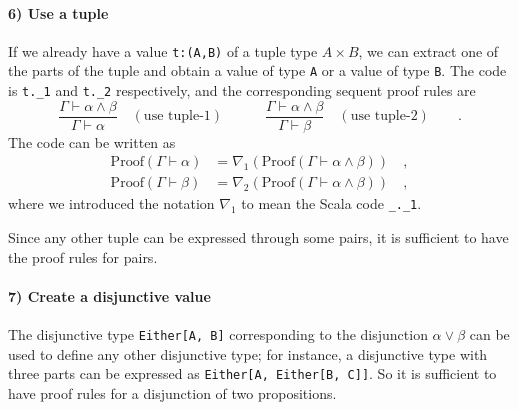 \paragraph{6) Use a tuple}

If we already have a value \lstinline!t:(A,B)!
of a tuple type $A\times B$, we can extract one of the parts of the
tuple and obtain a value of type \lstinline!A!
or a value of type \lstinline!B!.
The code is \lstinline!t._1!
and \lstinline!t._2! respectively,
and the corresponding sequent proof rules are
\[
\frac{\Gamma\vdash\alpha\wedge\beta}{\Gamma\vdash\alpha}\quad(\text{use tuple-}1)\quad\quad\quad\frac{\Gamma\vdash\alpha\wedge\beta}{\Gamma\vdash\beta}\quad(\text{use tuple-}2)\quad\quad.
\]
The code can be written as
\begin{align*}
\text{Proof}\left(\Gamma\vdash\alpha\right) & =\nabla_{1}\left(\text{Proof}\left(\Gamma\vdash\alpha\wedge\beta\right)\right)\quad,\\
\text{Proof}\left(\Gamma\vdash\beta\right) & =\nabla_{2}\left(\text{Proof}\left(\Gamma\vdash\alpha\wedge\beta\right)\right)\quad,
\end{align*}
where we introduced the notation $\nabla_{1}$ to mean the Scala code
\lstinline!_._1!.

Since any other tuple can be expressed through some pairs, it is sufficient
to have the proof rules for pairs.

\paragraph{7) Create a disjunctive value}

The disjunctive type \lstinline!Either[A, B]!
corresponding to the disjunction $\alpha\vee\beta$ can be used to
define any other disjunctive type; for instance, a disjunctive type
with three parts can be expressed as \lstinline!Either[A, Either[B, C]]!.
So it is sufficient to have proof rules for a disjunction of two propositions.

